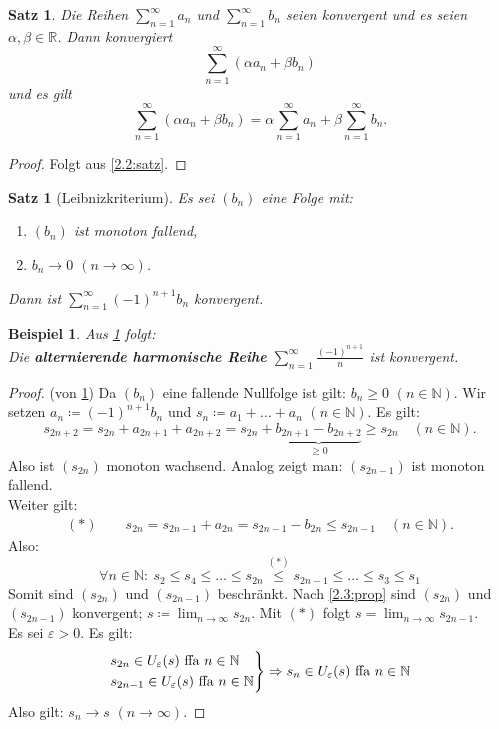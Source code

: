 \documentclass[12pt]{extreport} %
\newcommand{\N}{\mathbb{N}}
\newcommand{\R}{\mathbb{R}}
\theoremstyle{named}
\theoremstyle{itshape}
\newtheorem{satz}[unnamedtheorem]{Satz}
\theoremstyle{normal}
\newtheorem*{beispiel*}{Beispiel}
\begin{document}
\begin{satz} \label{3.2:satz}
	Die Reihen $\sum_{n=1}^{\infty} a_{n}$ und $\sum_{n=1}^{\infty} b_{n}$ seien konvergent und es seien $\alpha, \beta \in \R$. Dann konvergiert
		$$ \sum_{n=1}^{\infty} ( \alpha a_{n} + \beta b_{n}) $$
	und es gilt $$\sum_{n=1}^{\infty} ( \alpha a_{n} + \beta b_{n}) = \alpha \sum_{n=1}^{\infty} a_{n} + \beta \sum_{n=1}^{\infty} b_{n}.$$
\end{satz}

\begin{proof}
	Folgt aus \ref{2.2:satz}.
\end{proof}

\begin{satz}[Leibnizkriterium] \label{3.3:prop-LeibnizKriterium}
	Es sei $(b_{n})$ eine Folge mit:
	\begin{enumerate}
	 \item $(b_{n})$ ist monoton fallend,
	 \item $b_{n} \rightarrow 0$ $(n \to \infty)$.
	\end{enumerate}
	 Dann ist $\sum_{n=1}^{\infty} (-1)^{n+1}b_{n}$ konvergent.
\end{satz}

\begin{beispiel*}
	Aus \ref{3.3:prop-LeibnizKriterium} folgt: \\
	Die \textbf{alternierende harmonische Reihe} $\sum_{n=1}^{\infty} \frac{(-1)^{n+1}}{n}$ ist konvergent.
\end{beispiel*}

\begin{proof}(von \ref{3.3:prop-LeibnizKriterium}) Da $(b_n)$ eine fallende Nullfolge ist gilt: $b_n \ge 0$ $(n \in \N)$. Wir setzen $a_{n} \coloneqq (-1)^{n+1} b_{n}$ und
        $s_{n} \coloneqq a_{1} + \dotsc + a_{n}$ $(n \in \N)$. Es gilt:
	$$
	s_{2n+2} = s_{2n} + a_{2n+1} + a_{2n+2} = s_{2n} + \underbrace{b_{2n+1}-b_{2n+2}}_{\geq 0} \geq s_{2n} \quad (n \in \N).
	$$
	Also ist $(s_{2n})$ monoton wachsend. Analog zeigt man: $(s_{2n-1})$ ist monoton fallend. \\
	Weiter gilt:
	\begin{align*}
	(\ast)	\quad \quad s_{2n} = s_{2n-1} + a_{2n} = s_{2n-1} - b_{2n} \leq s_{2n-1} \quad (n \in \N).
	\end{align*}
	Also:
	$$ \forall n \in \N: ~ s_{2} \leq s_{4} \leq \dotsc \leq s_{2n} \overset{(*)}{\leq} s_{2n-1} \leq \dotsc \leq s_{3} \leq s_{1} $$
	Somit sind $(s_{2n})$ und $(s_{2n-1})$ beschränkt. Nach \ref{2.3:prop} sind $(s_{2n})$ und $(s_{2n-1})$ konvergent; $s \coloneqq \lim_{n \to \infty} s_{2n}$. Mit $(*)$ 
	folgt $s = \lim_{n \to \infty}  s_{2n-1}$. \\
	Es sei $\varepsilon > 0$. Es gilt:
	$$
		\begin{rcases*}
	 		s_{2n} \in U_{\varepsilon}(s) \text{ ffa } n \in \N \\
	 		s_{2n-1} \in U_{\varepsilon}(s) \text{ ffa } n \in \N  	
		\end{rcases*} \Rightarrow s_{n} \in U_{\varepsilon}(s) \text{ ffa } n \in \N
	$$
	Also gilt: $s_{n} \rightarrow s$ $(n \to \infty)$.
\end{proof}
\end{document}
